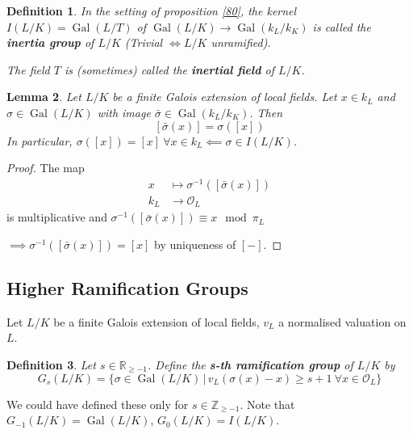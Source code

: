 \documentclass[a4paper]{article}
\newtheorem{definition}{Definition}
\newtheorem{lemma}[definition]{Lemma}
\DeclareMathOperator{\Gal}{Gal}
\begin{document}
\begin{definition}
	In the setting of proposition \ref{80},
	the kernel $I(L/K) = \Gal(L/T)$ of $\Gal(L/K) \to \Gal(k_L/k_K)$ is called the \textbf{inertia group} of $L/K$
	(Trivial $\iff L/K$ unramified).
	
	The field $T$ is (sometimes) called the \textbf{inertial field} of $L/K$.
\end{definition}

\begin{lemma}
	Let $L/K$ be a finite Galois extension of local fields.
	Let $x \in k_L$ and $\sigma \in \Gal(L/K)$ with image $\bar{\sigma} \in \Gal(k_L/k_K)$.
	Then
	$$[\bar{\sigma}(x)] = \sigma([x])$$
	In particular, $\sigma([x]) = [x]\ \forall x \in k_L \impliedby \sigma \in I(L/K)$.
	\label{82}
\end{lemma}
\begin{proof}
	The map
	\begin{align*}
		x &\mapsto \sigma^{-1}([\bar{\sigma}(x)]) \\
		k_L & \to \mathcal{O}_L
	\end{align*}
	is multiplicative and $\sigma^{-1}([\bar{\sigma}(x)]) \equiv x \mod \pi_L$
	
	$\implies \sigma^{-1}([\bar{\sigma}(x)]) = [x]$ by uniqueness of $[-]$.
\end{proof}

\subsection{Higher Ramification Groups}
Let $L/K$ be a finite Galois extension of local fields, $v_L$ a normalised valuation on $L$.

\begin{definition}
	Let $s \in \mathbb{R}_{\geq -1}$.
	Define the \textbf{s-th ramification group} of $L/K$ by
	$$G_s(L/K) = \{\sigma \in \Gal(L/K) \,|\, v_L(\sigma(x) - x) \geq s + 1 \ \forall x \in \mathcal{O}_L \}$$
\end{definition}

We could have defined these only for $s \in \mathbb{Z}_{\geq -1}$.
Note that $G_{-1}(L/K) = \Gal(L/K)$, $G_0(L/K) = I(L/K)$.
\end{document}
